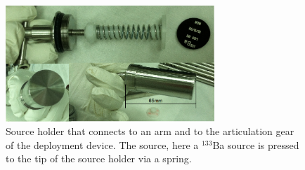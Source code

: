 \begin{figure}[htbp]
 \centering
  \includegraphics[width=0.7\textwidth]{Figures/SourceHolder.png}
  \caption{Source holder that connects to an arm and to the articulation gear of the deployment device. The source, here a $^{133}$Ba source is pressed to the tip of the source holder via a spring.}
  \label{fig:SourceHolder}
\end{figure}